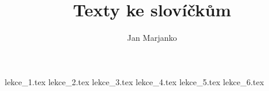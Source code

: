 \documentclass[article]{jlreq}
\title{Texty ke slovíčkům}
\author{Jan Marjanko}
\begin{document}
\maketitle
\tableofcontents
\newpage

{lekce_1.tex}
{lekce_2.tex}
{lekce_3.tex}
{lekce_4.tex}
{lekce_5.tex}
{lekce_6.tex}
\end{document}
